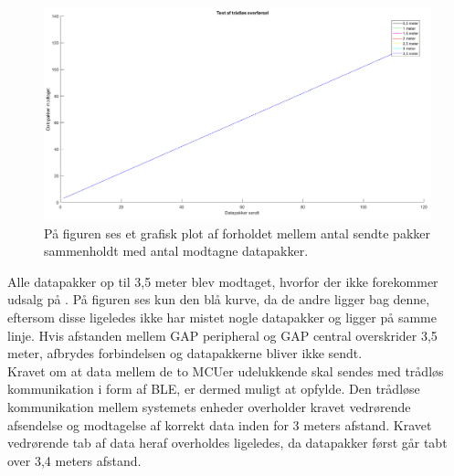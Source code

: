 \begin{figure}[H]
	\centering
	\includegraphics[scale=0.45]{figures/cDesign/test_ble.png}
	\caption{På figuren ses et grafisk plot af forholdet mellem antal sendte pakker sammenholdt med antal modtagne datapakker. }
	\label{fig:test_ble}
\end{figure}
Alle datapakker op til 3,5 meter blev modtaget, hvorfor der ikke forekommer udsalg på . På figuren ses kun den blå kurve, da de andre ligger bag denne, eftersom disse ligeledes ikke har mistet nogle datapakker og ligger på samme linje. Hvis afstanden mellem GAP peripheral og GAP central overskrider 3,5 meter, afbrydes forbindelsen og datapakkerne bliver ikke sendt. \\
Kravet om at data mellem de to MCUer udelukkende skal sendes med trådløs kommunikation i form af BLE, er dermed muligt at opfylde. Den trådløse kommunikation mellem systemets enheder overholder kravet vedrørende afsendelse og modtagelse af korrekt data inden for 3 meters afstand. Kravet vedrørende tab af data heraf overholdes ligeledes, da datapakker først går tabt over 3,4 meters afstand.
